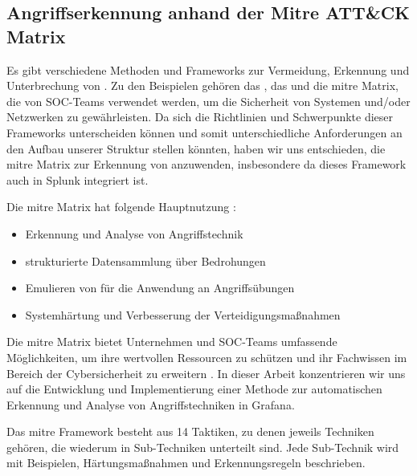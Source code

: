 \subsection{Angriffserkennung anhand der Mitre ATT\&CK Matrix\textregistered}
Es gibt verschiedene Methoden und Frameworks zur Vermeidung, Erkennung und Unterbrechung von . Zu den Beispielen gehören das , das und die \gls{mitre} Matrix, die von \gls{SOC}-Teams verwendet werden, um die Sicherheit von Systemen und/oder Netzwerken zu gewährleisten. Da sich die Richtlinien und Schwerpunkte dieser Frameworks unterscheiden können und somit unterschiedliche Anforderungen an den Aufbau unserer Struktur stellen könnten, haben wir uns entschieden, die \gls{mitre} Matrix zur Erkennung von  anzuwenden, insbesondere da dieses Framework auch in Splunk integriert ist.

Die \gls{mitre} Matrix hat folgende Hauptnutzung \citep{Mitre_Started}:

{
\begin{itemize}[noitemsep]
   \item Erkennung und Analyse von Angriffstechnik
   \item	strukturierte Datensammlung über Bedrohungen
   \item	Emulieren von  für die Anwendung an Angriffsübungen
   \item	Systemhärtung und Verbesserung der Verteidigungsmaßnahmen
\end{itemize}
}

Die \gls{mitre} Matrix bietet Unternehmen und \gls{SOC}-Teams umfassende Möglichkeiten, um ihre wertvollen Ressourcen zu schützen und ihr Fachwissen im Bereich der \gls{Cybersicherheit} zu erweitern \citep{Hazel_howtousemitre}. In dieser Arbeit konzentrieren wir uns auf die Entwicklung und Implementierung einer Methode zur automatischen Erkennung und Analyse von Angriffstechniken in Grafana.

Das \gls{mitre} Framework besteht aus 14 Taktiken, zu denen jeweils Techniken gehören, die wiederum in Sub-Techniken unterteilt sind. Jede Sub-Technik wird mit Beispielen, Härtungsmaßnahmen und Erkennungsregeln beschrieben.

